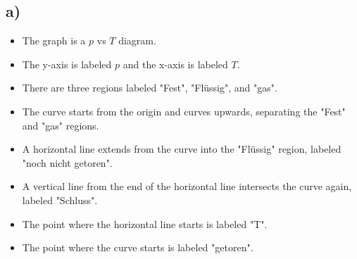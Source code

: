 

\subsection*{a)}

\begin{itemize}
    \item The graph is a $p$ vs $T$ diagram.
    \item The y-axis is labeled $p$ and the x-axis is labeled $T$.
    \item There are three regions labeled "Fest", "Flüssig", and "gas".
    \item The curve starts from the origin and curves upwards, separating the "Fest" and "gas" regions.
    \item A horizontal line extends from the curve into the "Flüssig" region, labeled "noch nicht getoren".
    \item A vertical line from the end of the horizontal line intersects the curve again, labeled "Schluss".
    \item The point where the horizontal line starts is labeled "T".
    \item The point where the curve starts is labeled "getoren".
\end{itemize}